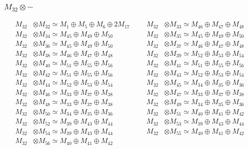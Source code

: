 \subsubsection{$ M_{32}\otimes -$}
\begin{align*}
M_{32} &\otimes M_{32} \simeq M_{1} \oplus M_{5} \oplus M_{6} \oplus 2M_{17} &&& M_{32} &\otimes M_{33} \simeq M_{46} \oplus M_{47} \oplus M_{48}\\
M_{32} &\otimes M_{34} \simeq M_{45} \oplus M_{49} \oplus M_{50} &&& M_{32} &\otimes M_{35} \simeq M_{45} \oplus M_{49} \oplus M_{50}\\
M_{32} &\otimes M_{36} \simeq M_{45} \oplus M_{49} \oplus M_{50} &&& M_{32} &\otimes M_{37} \simeq M_{46} \oplus M_{47} \oplus M_{48}\\
M_{32} &\otimes M_{38} \simeq M_{46} \oplus M_{47} \oplus M_{48} &&& M_{32} &\otimes M_{39} \simeq M_{52} \oplus M_{53} \oplus M_{54}\\
M_{32} &\otimes M_{40} \simeq M_{51} \oplus M_{55} \oplus M_{56} &&& M_{32} &\otimes M_{41} \simeq M_{51} \oplus M_{55} \oplus M_{56}\\
M_{32} &\otimes M_{42} \simeq M_{51} \oplus M_{55} \oplus M_{56} &&& M_{32} &\otimes M_{43} \simeq M_{52} \oplus M_{53} \oplus M_{54}\\
M_{32} &\otimes M_{44} \simeq M_{52} \oplus M_{53} \oplus M_{54} &&& M_{32} &\otimes M_{45} \simeq M_{34} \oplus M_{35} \oplus M_{36}\\
M_{32} &\otimes M_{46} \simeq M_{33} \oplus M_{37} \oplus M_{38} &&& M_{32} &\otimes M_{47} \simeq M_{33} \oplus M_{37} \oplus M_{38}\\
M_{32} &\otimes M_{48} \simeq M_{33} \oplus M_{37} \oplus M_{38} &&& M_{32} &\otimes M_{49} \simeq M_{34} \oplus M_{35} \oplus M_{36}\\
M_{32} &\otimes M_{50} \simeq M_{34} \oplus M_{35} \oplus M_{36} &&& M_{32} &\otimes M_{51} \simeq M_{40} \oplus M_{41} \oplus M_{42}\\
M_{32} &\otimes M_{52} \simeq M_{39} \oplus M_{43} \oplus M_{44} &&& M_{32} &\otimes M_{53} \simeq M_{39} \oplus M_{43} \oplus M_{44}\\
M_{32} &\otimes M_{54} \simeq M_{39} \oplus M_{43} \oplus M_{44} &&& M_{32} &\otimes M_{55} \simeq M_{40} \oplus M_{41} \oplus M_{42}\\
M_{32} &\otimes M_{56} \simeq M_{40} \oplus M_{41} \oplus M_{42}
\end{align*}


